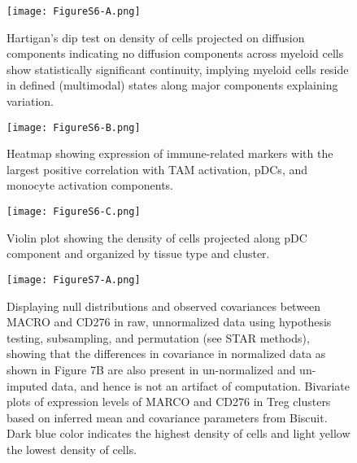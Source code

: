 \begin{figure}
\centering
\texttt{[image: FigureS6-A.png]}
\caption{Hartigan’s dip test on density of cells projected on diffusion components indicating no diffusion components across myeloid cells show statistically significant continuity, implying myeloid cells reside in defined (multimodal) states along major components explaining variation.}
\label{fig:s6a}
\end{figure}

\begin{figure}
\centering
\texttt{[image: FigureS6-B.png]}
\caption{Heatmap showing expression of immune-related markers with the largest positive correlation with TAM activation, pDCs, and monocyte activation components.
}
\label{fig:s6b}
\end{figure}


\begin{figure}
\centering
\texttt{[image: FigureS6-C.png]}
\caption{Violin plot showing the density of cells projected along pDC component and organized by tissue type and cluster.
}
\label{fig:s6c}
\end{figure}


\begin{figure}
\centering
\texttt{[image: FigureS7-A.png]}
\caption{Displaying null distributions and observed covariances between MACRO and CD276 in raw, unnormalized data using hypothesis testing, subsampling, and permutation (see STAR methods), showing that the differences in covariance in normalized data as shown in  Figure 7B are also present in un-normalized and un-imputed data, and hence is not an artifact of computation.
Bivariate plots of expression levels of MARCO and CD276 in Treg clusters based on inferred mean and covariance parameters from Biscuit. Dark blue color indicates the highest density of cells and light yellow the lowest density of cells.
}
\label{fig:s7a}
\end{figure}

